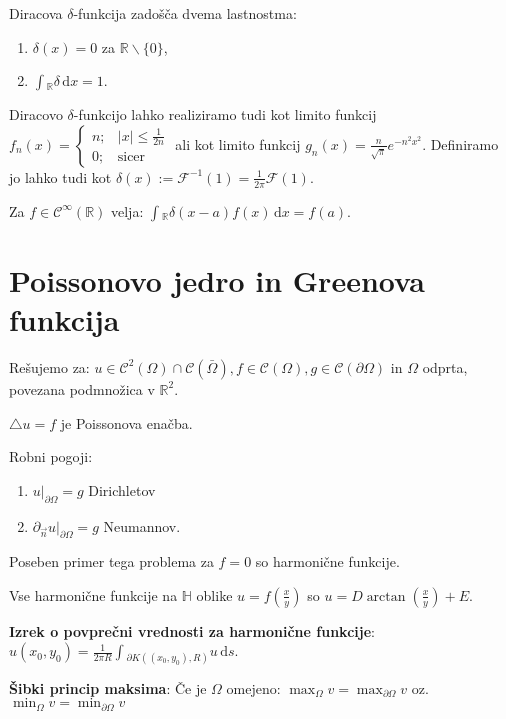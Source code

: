 \documentclass[11pt,a4paper]{amsart}
\theoremstyle{definition} %
\theoremstyle{plain} %
\newcommand{\ds}{\ensuremath{\,\mathrm{d}s}}
\newcommand{\dx}{\ensuremath{\,\mathrm{d}x}}
\let\oldint\int
\renewcommand{\int}{\oldint \!}
\newcommand{\R}{\mathbb R}
\newcommand{\F}{\mathcal{F}}
\newcommand{\Cont}{\mathcal{C}}
\begin{document}
Diracova $\delta$-funkcija zadošča dvema lastnostma:
\begin{enumerate}

\item $\delta (x) = 0$ za $\R \backslash \{0\}$,

\item $\int_\R \delta \dx = 1$.

\end{enumerate}

Diracovo $\delta$-funkcijo lahko realiziramo tudi kot limito funkcij $f_n (x) = \begin{cases} n;& |x| \leq \frac{1}{2n} \\ 0;& \text{sicer}\end{cases}$ ali kot limito funkcij $g_n(x) = \frac{n}{\sqrt{\pi}} e^{-n^2x^2}$. Definiramo jo lahko tudi kot $\delta (x) := \F^{-1}(1) = \frac{1}{2\pi} \F (1)$.

Za $f \in \Cont^\infty (\R)$ velja: $\int_\R \delta (x-a) f(x) \dx = f(a)$.

\section*{Poissonovo jedro in Greenova funkcija}

Rešujemo za: $u \in \Cont^2 ( \Omega) \cap \Cont (\bar{\Omega}), f \in \Cont ( \Omega ), g \in \Cont ( \partial \Omega )$ in $\Omega$ odprta, povezana podmnožica v $\R^2$.

$\triangle u = f$ je Poissonova enačba.

Robni pogoji:
\begin{enumerate}

\item $u|_{\partial \Omega} = g$ Dirichletov

\item $\partial_{\vec{n}} u |_{\partial \Omega} = g$ Neumannov.

\end{enumerate}

Poseben primer tega problema za $f=0$ so harmonične funkcije.

Vse harmonične funkcije na $\mathbb{H}$ oblike $u = f(\frac{x}{y})$ so $u = D \arctan (\frac{x}{y}) + E$.

\textbf{Izrek o povprečni vrednosti za harmonične funkcije}: $u(x_0,y_0) = \frac{1}{2\pi R} \int_{\partial K((x_0,y_0),R)}u \ds$.

\textbf{Šibki princip maksima}: Če je $\Omega$ omejeno: $\max_{\Omega} v = \max_{\partial \Omega} v$ oz.  $\min_{\Omega} v = \min_{\partial \Omega} v$
\end{document}
